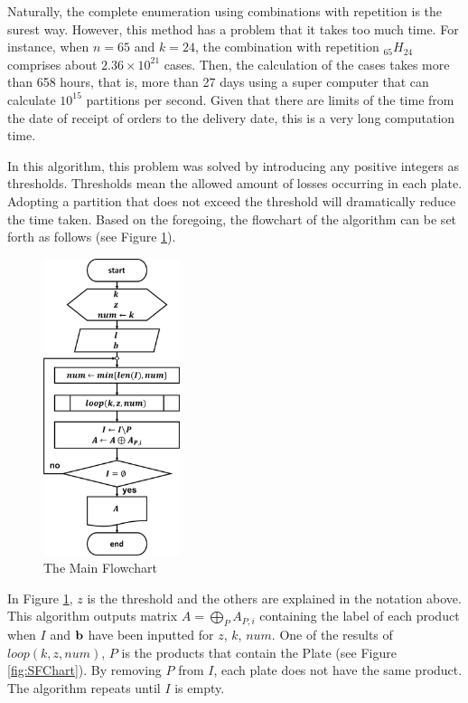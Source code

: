 \documentclass[a4paper]{amsart}
\numberwithin{equation}{section} %
\numberwithin{figure}{section} %
\numberwithin{table}{section}
\theoremstyle{plain}
\theoremstyle{definition}
\theoremstyle{plain}
\theoremstyle{plain}
\theoremstyle{plain}
\theoremstyle{plain}
\theoremstyle{plain}
\begin{document}
Naturally, the complete enumeration using combinations with repetition is the surest way. 
However, this method has a problem that it takes too much time. 
For instance, when $n=65$ and $k = 24$, the combination with repetition $_{65}H_{24}$ comprises about $2.36 \times 10^{21}$ cases.
Then, the calculation of the cases takes more than 658 hours, that is, more than 27 days using a super computer that can calculate $10^{15}$ partitions per second. 
Given that there are limits of the time from the date of receipt of orders to the delivery date, this is a very long computation time.

In this algorithm, this problem was solved by introducing any positive integers as thresholds. 
Thresholds mean the allowed amount of losses occurring in each plate. 
Adopting a partition that does not exceed the threshold will dramatically reduce the time taken.
Based on the foregoing, the flowchart of the algorithm can be set forth as follows (see Figure \ref{fig:MFChart}).

\begin{figure}[h!]
	\centering
	\includegraphics[width=4cm]{MainFChart.pdf}
	\caption{The Main Flowchart}
	\label{fig:MFChart}       %
\end{figure}

In Figure \ref{fig:MFChart}, $z$ is the threshold and the others are explained in the notation above.
This algorithm outputs matrix $A=\bigoplus\limits_{P} A_{P,i}$ containing the label of each product when $I$ and ${\bf b}$ have been inputted for $z$, $k$, $num$. 
One of the results of ${loop}(k, z, num)$, $P$ is the products that contain the Plate (see Figure \ref{fig:SFChart}). 
By removing $P$ from $I$, each plate does not have the same product.
The algorithm repeats until $I$ is empty.
\end{document}
